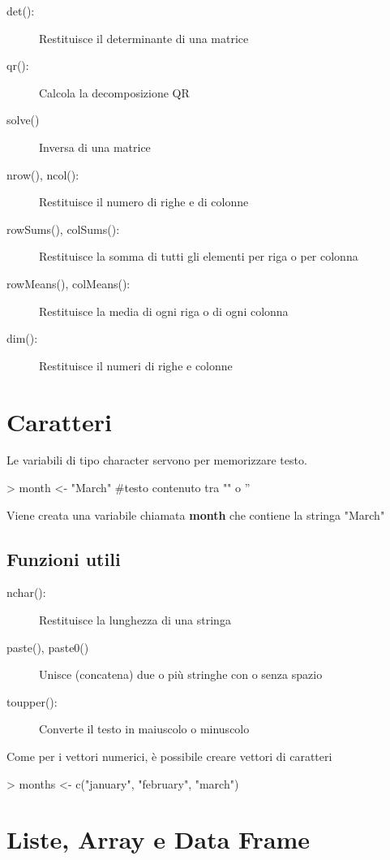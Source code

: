 \begin{description}
  \item[det():] Restituisce il determinante di una matrice
  \item[qr():] Calcola la decomposizione QR 
  \item[solve()] Inversa di una matrice
  \item[nrow(), ncol():] Restituisce il numero di righe e di colonne
  \item[rowSums(), colSums():] Restituisce la somma di tutti gli elementi per riga o per colonna
  \item[rowMeans(), colMeans():] Restituisce la media di ogni riga o di ogni colonna
  \item[dim():] Restituisce il numeri di righe e colonne
\end{description}


\section{Caratteri}
Le variabili di tipo character servono per memorizzare testo.
\begin{codiceR}
  > month <- "March" #testo contenuto tra "" o ''
\end{codiceR}
Viene creata una variabile chiamata \textbf{month} che contiene la stringa "March"

\subsection{ Funzioni utili}
\begin{description}
  \item[nchar():] Restituisce la lunghezza di una stringa
  \item[paste(), paste0()] Unisce (concatena) due o più stringhe con o senza spazio
  \item[toupper():] Converte il testo in maiuscolo o minuscolo 
\end{description}

Come per i vettori numerici, è possibile creare vettori di caratteri
\begin{codiceR}
  > months <- c("january", "february", "march")
\end{codiceR}



\section{Liste, Array e Data Frame}

